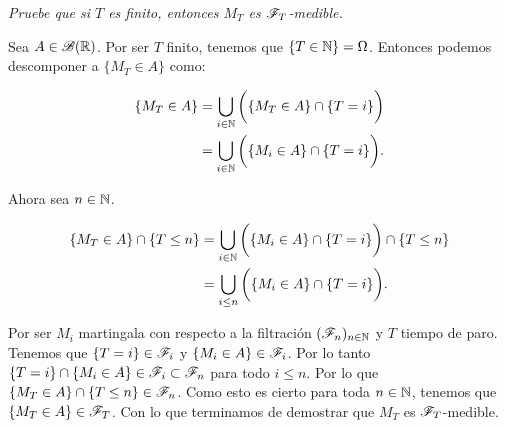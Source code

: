 \emph{
	Pruebe que si ${T}$ es finito, entonces ${M_T}$ es ${\mathscr{F}_T}$-medible.\\
}

	Sea $A \in \mathscr{B}(\mathbb{R})$. Por ser $T$ finito, tenemos que $\{ T \in \mathbb{N} \} = \Omega$. Entonces
	podemos descomponer a $\{ M_T \in A \}$ como:
	
	\begin{align}
		\{ M_T \in A \}		&=		\bigcup_{i \in \mathbb{N}} \bigg( \{ M_T \in A \} \cap \{ T = i \} \bigg)\\
							&=		\bigcup_{i \in \mathbb{N}} \bigg( \{ M_i \in A \} \cap \{ T = i \} \bigg).
	\end{align}

	Ahora sea $n \in \mathbb{N}$. 
	
	\begin{align}
		\{ M_T \in A \} \cap \{ T \leq n \}		&=		\bigcup_{i \in \mathbb{N}} \bigg( \{ M_i \in A \} \cap \{ T = i \} \bigg) \cap \{ T \leq n \} \\
												&=		\bigcup_{i \leq n} \bigg( \{ M_i \in A \} \cap \{ T = i \} \bigg).
	\end{align}
	
	Por ser ${M_i}$ martingala con respecto a la filtración ${(\mathscr{F}_n)_{n \in \mathbb{N}}}$ y ${T}$ tiempo de paro. Tenemos que ${\{ T = i\} \in \mathscr{F}_i}$ y
	${\{ M_i \in A \} \in \mathscr{F}_i}$. Por lo tanto ${\{ T = i\} \cap \{ M_i \in A \} \in \mathscr{F}_i \subset \mathscr{F}_n}$ para todo ${i \leq n}$. Por lo que
	${\{ M_T \in A \} \cap \{ T \leq n \} \in \mathscr{F}_n}$. Como esto es cierto para toda $n \in \mathbb{N}$, tenemos que ${\{ M_T \in A \} \in \mathscr{F}_T}$. Con
	lo que terminamos de demostrar que ${M_T}$ es ${\mathscr{F}_T}$-medible.\\
	